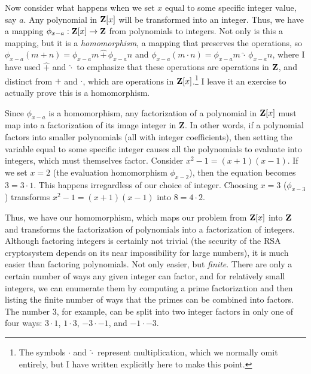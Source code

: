 Now consider what happens when we set $x$ equal to some specific
integer value, say $a$.  Any polynomial in ${\bf Z}[x]$ will be
transformed into an integer.  Thus, we have a mapping $\phi_{x-a}:
{\bf Z}[x] \rightarrow {\bf Z}$ from polynomials to integers.  Not
only is this a mapping, but it is a {\it homomorphism}, a mapping that
preserves the operations, so $\phi_{x-a} (m+n) = \phi_{x-a}m \,\hat+\,
\phi_{x-a}n$ and $\phi_{x-a} (m\cdot n) = \phi_{x-a}m \,\hat\cdot\,
\phi_{x-a}n$, where I have used $\hat+$ and $\hat\cdot$ to emphasize
that these operations are operations in ${\bf Z}$, and distinct from
$+$ and $\cdot$, which are operations in ${\bf Z}[x]$.\footnote{The
symbols $\cdot$ and $\hat\cdot$ represent multiplication, which we normally
omit entirely, but I have written explicitly here to make this point.}
I leave it an exercise to actually prove this is a homomorphism.

Since $\phi_{x-a}$ is a homomorphism, any factorization of a
polynomial in ${\bf Z}[x]$ must map into a factorization of its image
integer in {\bf Z}.  In other words, if a polynomial factors into
smaller polynomials (all with integer coefficients), then setting the
variable equal to some specific integer causes all the polynomials to
evaluate into integers, which must themselves factor.  Consider
$x^2-1=(x+1)(x-1)$.  If we set $x=2$ (the evaluation homomorphism
$\phi_{x-2}$), then the equation becomes $3=3\cdot1$.  This happens
irregardless of our choice of integer.  Choosing $x=3$ ($\phi_{x-3}$)
transforms $x^2-1=(x+1)(x-1)$ into $8=4\cdot2$.

Thus, we have our homomorphism, which maps our problem from ${\bf
Z}[x]$ into ${\bf Z}$ and transforms the factorization of polynomials
into a factorization of integers.  Although factoring integers is
certainly not trivial (the security of the RSA cryptosystem depends on
its near impossibility for large numbers), it is much easier than
factoring polynomials.  Not only easier, but {\it finite}.  There are
only a certain number of ways any given integer can factor, and for
relatively small integers, we can enumerate them by computing a prime
factorization and then listing the finite number of ways that the
primes can be combined into factors.  The number $3$, for example, can
be split into two integer factors in only one of four ways: $3\cdot1$,
$1\cdot3$, $-3\cdot-1$, and $-1\cdot-3$.


